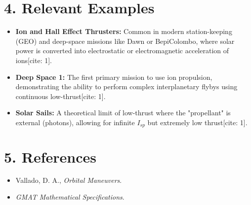 \documentclass[11pt, a4paper]{article}
\begin{document}
\section{4. Relevant Examples}
\begin{itemize}
    \item \textbf{Ion and Hall Effect Thrusters:} Common in modern station-keeping (GEO) and deep-space missions like Dawn or BepiColombo, where solar power is converted into electrostatic or electromagnetic acceleration of ions[cite: 1].
    \item \textbf{Deep Space 1:} The first primary mission to use ion propulsion, demonstrating the ability to perform complex interplanetary flybys using continuous low-thrust[cite: 1].
    \item \textbf{Solar Sails:} A theoretical limit of low-thrust where the "propellant" is external (photons), allowing for infinite $I_{sp}$ but extremely low thrust[cite: 1].
\end{itemize}

\section{5. References}
\begin{itemize}
    \item [cite: 1] Vallado, D. A., \textit{Orbital Maneuvers}.
    \item [cite: 2] \textit{GMAT Mathematical Specifications}.
\end{itemize}
\end{document}
